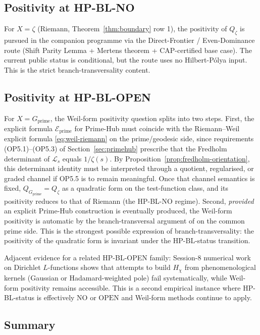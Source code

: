 \documentclass[11pt]{article}
\theoremstyle{definition}
\theoremstyle{remark}
\newcommand{\HBL}{\mathrm{HP\text{-}BL}}
\begin{document}
\subsection{Positivity at HP-BL-NO}

For $X = \zeta$ (Riemann, Theorem~\ref{thm:boundary} row 1), the
positivity of $Q_\zeta$ is pursued in the companion programme
\cite{Geiger2026RHII} via the Direct-Frontier / Even-Dominance route
(Shift Parity Lemma + Mertens theorem + CAP-certified base case).
The current public status is conditional, but the route uses no
Hilbert-P\'olya input. This is the strict branch-transversality content.

\subsection{Positivity at HP-BL-OPEN}

For $X = G_\mathrm{prime}$, the Weil-form positivity question splits
into two steps. First, the explicit formula $\mathcal{E}_\mathrm{prime}$
for Prime-Hub must coincide with the Riemann--Weil explicit formula
\eqref{eq:weil-riemann} on the prime/geodesic side, since
requirements (OP5.1)--(OP5.3) of Section~\ref{sec:primehub} prescribe
that the Fredholm determinant of $\mathcal{L}_s$ equals $1/\zeta(s)$.
By Proposition~\ref{prop:fredholm-orientation}, this determinant
identity must be interpreted through a quotient, regularised, or
graded channel if OP5.5 is to remain meaningful. Once that channel
semantics is fixed, $Q_{G_\mathrm{prime}} = Q_\zeta$ as a quadratic form on
the test-function class, and its positivity reduces to that of
Riemann (the HP-BL-NO regime). Second, \emph{provided} an explicit
Prime-Hub construction is eventually produced, the Weil-form
positivity is automatic by the branch-transversal argument of
\cite{Geiger2026RHII} on the common prime side. This is the strongest
possible expression of branch-transversality: the positivity of the
quadratic form is invariant under the $\HBL$-status transition.

Adjacent evidence for a related HP-BL-OPEN family: Session-8
numerical work on Dirichlet $L$-functions
\cite{PaleyWienerDirichlet} shows that attempts to build $H_\chi$
from phenomenological kernels (Gaussian or Hadamard-weighted pole)
fail systematically, while Weil-form positivity remains accessible.
This is a second empirical instance where HP-BL-status is
effectively $\mathrm{NO}$ or $\mathrm{OPEN}$ and Weil-form methods
continue to apply.

\subsection{Summary}
\end{document}
